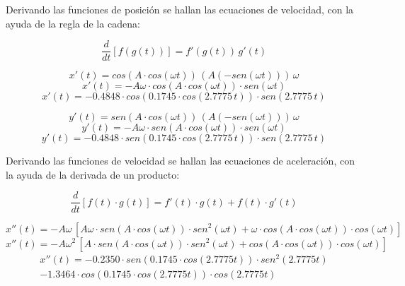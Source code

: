 \documentclass[letter,11pt]{article}
\begin{document}
Derivando las funciones de posición se hallan las ecuaciones de velocidad, con
la ayuda de la regla de la cadena:

\begin{equation*}
    \frac{d}{dt} \left[f(g(t))\right] = f'(g(t))\, g'(t)
\end{equation*}

\begin{equation*}
    x'(t) = cos(A \cdot cos(\omega t))\, (A (-sen(\omega t)))\, \omega
\end{equation*}
\begin{equation*}
    x'(t) = -A \omega \cdot cos(A \cdot cos(\omega t)) \cdot sen(\omega t)
\end{equation*}
\begin{equation}
    x'(t) = -0.4848 \cdot cos(0.1745 \cdot cos(2.7775\, t)) \cdot sen(2.7775\, t)
\end{equation}

\begin{equation*}
    y'(t) = sen(A \cdot cos(\omega t))\, (A (-sen(\omega t)))\, \omega
\end{equation*}
\begin{equation*}
    y'(t) = - A \omega \cdot sen(A \cdot cos(\omega t)) \cdot sen(\omega t)
\end{equation*}
\begin{equation}
    y'(t) = - 0.4848 \cdot sen(0.1745 \cdot cos(2.7775\, t)) \cdot sen(2.7775\, t)
\end{equation}

Derivando las funciones de velocidad se hallan las ecuaciones de aceleración,
con la ayuda de la derivada de un producto:

\begin{equation*}
    \frac{d}{dt} \left[f(t) \cdot g(t)\right] = f'(t) \cdot g(t) + f(t) \cdot g'(t)
\end{equation*}

\begin{equation*}
    x''(t) = -A \omega\, [ A \omega \cdot sen(A \cdot cos(\omega t)) \cdot sen^2(\omega t) + \omega \cdot cos(A \cdot cos(\omega t)) \cdot cos(\omega t)]
\end{equation*}
\begin{equation*}
    x''(t) = -A \omega^2\, [ A \cdot sen(A \cdot cos(\omega t)) \cdot sen^2(\omega t) + cos(A \cdot cos(\omega t)) \cdot cos(\omega t)]
\end{equation*}
\begin{equation}
    \begin{split}
        x''(t) = -0.2350 \cdot sen(0.1745 \cdot cos(2.7775 t)) \cdot sen^2(2.7775 t) \\
                 -1.3464 \cdot cos(0.1745 \cdot cos(2.7775t)) \cdot cos(2.7775t)
    \end{split}
\end{equation}
\end{document}
